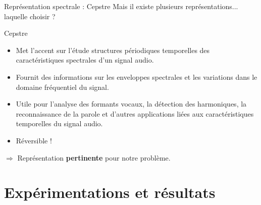 \documentclass[compress,xcolor=table]{beamer}
\begin{document}
\begin{frame}{Représentation spectrale : Cepstre}
    Mais il existe plusieurs représentations... laquelle choisir ?

    \begin{block}{Cepstre}
        
        \begin{itemize}
            \item Met l'accent sur l'étude structures périodiques temporelles des caractéristiques spectrales d'un signal audio.
            \item Fournit des informations sur les enveloppes spectrales et les variations dans le domaine fréquentiel du signal.
            \item Utile pour l'analyse des formants vocaux, la détection des harmoniques, la reconnaissance de la parole et d'autres applications liées aux caractéristiques temporelles du signal audio.
            \item Réversible !
        \end{itemize}

    \end{block}

    $\Rightarrow$ Représentation \textbf{pertinente} pour notre problème.

\end{frame}

\section{Expérimentations et résultats} \subsection{}
\end{document}
